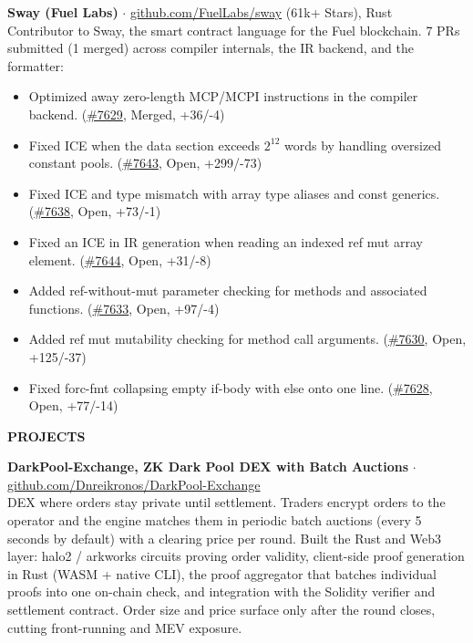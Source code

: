 \documentclass[10pt,a4paper]{article}
\newcommand{\cvsection}[1]{%
    \vspace{8pt}%
    {\large\bfseries\uppercase{#1}}\\[2pt]%
    \vspace{2pt}%
}
\begin{document}
\vspace{4pt}
\noindent\textbf{\footnotesize Sway (Fuel Labs)} {\footnotesize $\cdot$ \href{https://github.com/FuelLabs/sway}{github.com/FuelLabs/sway} (61k+ Stars), Rust}\\
{\footnotesize Contributor to Sway, the smart contract language for the Fuel blockchain. 7 PRs submitted (1 merged) across compiler internals, the IR backend, and the formatter:}
\begin{itemize}
    \item {\footnotesize Optimized away zero-length MCP/MCPI instructions in the compiler backend. (\href{https://github.com/FuelLabs/sway/pull/7629}{\#7629}, Merged, +36/-4)}
    \item {\footnotesize Fixed ICE when the data section exceeds $2^{12}$ words by handling oversized constant pools. (\href{https://github.com/FuelLabs/sway/pull/7643}{\#7643}, Open, +299/-73)}
    \item {\footnotesize Fixed ICE and type mismatch with array type aliases and const generics. (\href{https://github.com/FuelLabs/sway/pull/7638}{\#7638}, Open, +73/-1)}
    \item {\footnotesize Fixed an ICE in IR generation when reading an indexed ref mut array element. (\href{https://github.com/FuelLabs/sway/pull/7644}{\#7644}, Open, +31/-8)}
    \item {\footnotesize Added ref-without-mut parameter checking for methods and associated functions. (\href{https://github.com/FuelLabs/sway/pull/7633}{\#7633}, Open, +97/-4)}
    \item {\footnotesize Added ref mut mutability checking for method call arguments. (\href{https://github.com/FuelLabs/sway/pull/7630}{\#7630}, Open, +125/-37)}
    \item {\footnotesize Fixed forc-fmt collapsing empty if-body with else onto one line. (\href{https://github.com/FuelLabs/sway/pull/7628}{\#7628}, Open, +77/-14)}
\end{itemize}

\cvsection{Projects}

\noindent\textbf{\footnotesize DarkPool-Exchange, ZK Dark Pool DEX with Batch Auctions} {\footnotesize $\cdot$ \href{https://github.com/Dnreikronos/DarkPool-Exchange}{github.com/Dnreikronos/DarkPool-Exchange}}\\
{\footnotesize DEX where orders stay private until settlement. Traders encrypt orders to the operator and the engine matches them in periodic batch auctions (every 5 seconds by default) with a clearing price per round. Built the Rust and Web3 layer: halo2 / arkworks circuits proving order validity, client-side proof generation in Rust (WASM + native CLI), the proof aggregator that batches individual proofs into one on-chain check, and integration with the Solidity verifier and settlement contract. Order size and price surface only after the round closes, cutting front-running and MEV exposure.}
\end{document}
